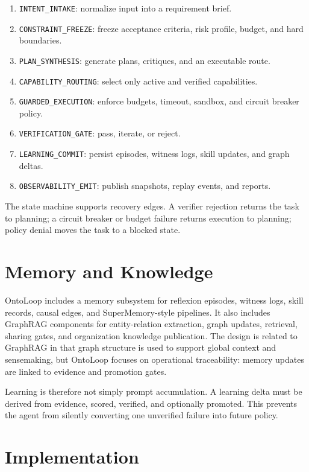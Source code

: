 \documentclass[11pt]{article}
\begin{document}
\begin{enumerate}
  \item \texttt{INTENT\_INTAKE}: normalize input into a requirement brief.
  \item \texttt{CONSTRAINT\_FREEZE}: freeze acceptance criteria, risk profile,
        budget, and hard boundaries.
  \item \texttt{PLAN\_SYNTHESIS}: generate plans, critiques, and an executable
        route.
  \item \texttt{CAPABILITY\_ROUTING}: select only active and verified capabilities.
  \item \texttt{GUARDED\_EXECUTION}: enforce budgets, timeout, sandbox, and circuit
        breaker policy.
  \item \texttt{VERIFICATION\_GATE}: pass, iterate, or reject.
  \item \texttt{LEARNING\_COMMIT}: persist episodes, witness logs, skill updates,
        and graph deltas.
  \item \texttt{OBSERVABILITY\_EMIT}: publish snapshots, replay events, and reports.
\end{enumerate}

The state machine supports recovery edges. A verifier rejection returns the task
to planning; a circuit breaker or budget failure returns execution to planning;
policy denial moves the task to a blocked state.

\section{Memory and Knowledge}

OntoLoop includes a memory subsystem for reflexion episodes, witness logs, skill
records, causal edges, and SuperMemory-style pipelines. It also includes GraphRAG
components for entity-relation extraction, graph updates, retrieval, sharing gates,
and organization knowledge publication. The design is related to GraphRAG
\cite{edge2024graphrag} in that graph structure is used to support global context
and sensemaking, but OntoLoop focuses on operational traceability: memory updates
are linked to evidence and promotion gates.

Learning is therefore not simply prompt accumulation. A learning delta must be
derived from evidence, scored, verified, and optionally promoted. This prevents
the agent from silently converting one unverified failure into future policy.

\section{Implementation}
\end{document}
